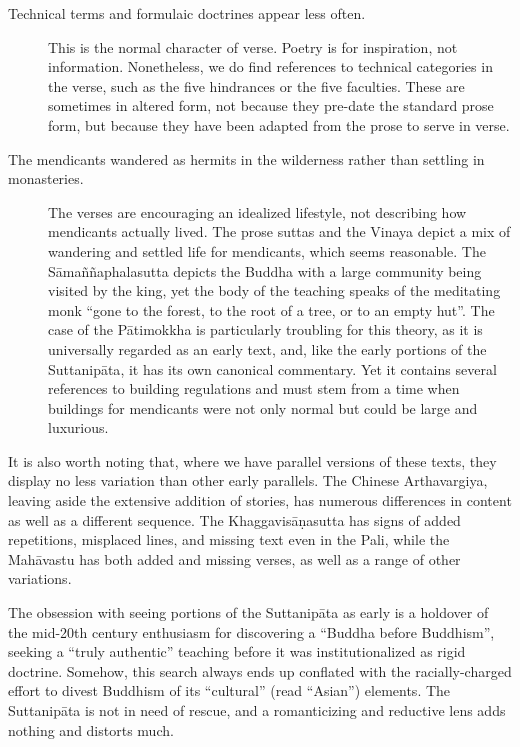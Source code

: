 \documentclass[12pt,openany]{book}%
\begin{document}
\begin{description}
\item[Technical terms and formulaic doctrines appear less often.] This is the normal character of verse. Poetry is for inspiration, not information. Nonetheless, we do find references to technical categories in the verse, such as the five hindrances or the five faculties. These are sometimes in altered form, not because they pre-date the standard prose form, but because they have been adapted from the prose to serve in verse.%
\item[The mendicants wandered as hermits in the wilderness rather than settling in monasteries.] The verses are encouraging an idealized lifestyle, not describing how mendicants actually lived. The prose suttas and the Vinaya depict a mix of wandering and settled life for mendicants, which seems reasonable. The \textsanskrit{Sāmaññaphalasutta} depicts the Buddha with a large community being visited by the king, yet the body of the teaching speaks of the meditating monk “gone to the forest, to the root of a tree, or to an empty hut”. The case of the \textsanskrit{Pātimokkha} is particularly troubling for this theory, as it is universally regarded as an early text, and, like the early portions of the \textsanskrit{Suttanipāta}, it has its own canonical commentary. Yet it contains several references to building regulations and must stem from a time when buildings for mendicants were not only normal but could be large and luxurious.%
\end{description}

It is also worth noting that, where we have parallel versions of these texts, they display no less variation than other early parallels. The Chinese Arthavargiya, leaving aside the extensive addition of stories, has numerous differences in content as well as a different sequence. The \textsanskrit{Khaggavisāṇasutta} has signs of added repetitions, misplaced lines, and missing text even in the Pali, while the \textsanskrit{Mahāvastu} has both added and missing verses, as well as a range of other variations.

The obsession with seeing portions of the \textsanskrit{Suttanipāta} as early is a holdover of the mid-20th century enthusiasm for discovering a “Buddha before Buddhism”, seeking a “truly authentic” teaching before it was institutionalized as rigid doctrine. Somehow, this search always ends up conflated with the racially-charged effort to divest Buddhism of its “cultural” (read “Asian”) elements. The \textsanskrit{Suttanipāta} is not in need of rescue, and a romanticizing and reductive lens adds nothing and distorts much.
\end{document}
